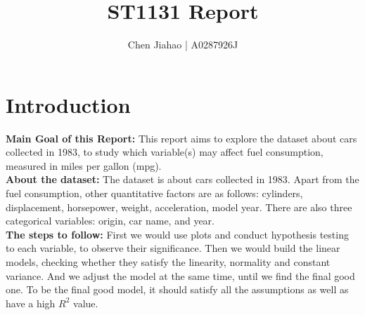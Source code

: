 \documentclass[12pt]{article}
\title{\vspace{-3cm}ST1131 Report\vspace{-0.8cm}} %
\author{Chen Jiahao | A0287926J} %
\date{} %
\begin{document}
\maketitle
\vspace{-2.1cm} %

\section{Introduction\vspace{-0.4cm}}
\textbf{Main Goal of this Report:}
This report aims to explore the dataset about cars collected in 1983, to study which variable(s) may affect fuel consumption, measured in miles per gallon (mpg).\\ 
\textbf{About the dataset:}
The dataset is about cars collected in 1983. Apart from the fuel consumption, other quantitative factors are as follows: cylinders, displacement, horsepower, weight, acceleration, model year. There are also three categorical variables: origin, car name, and year.\\ 
\textbf{The steps to follow:}
First we would use plots and conduct hypothesis testing to each variable, to observe their significance. Then we would build the linear models, checking whether they satisfy the linearity, normality and constant variance. And we adjust the model at the same time, until we find the final good one. To be the final good model, it should satisfy all the assumptions as well as have a high $R^{2}$ value.
\end{document}
